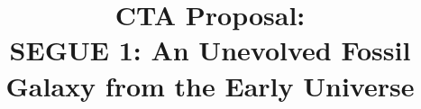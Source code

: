 \documentclass{aastex631}
\begin{document}
\title{CTA Proposal:\\SEGUE 1: An Unevolved Fossil Galaxy from the Early Universe}


\end{document}
